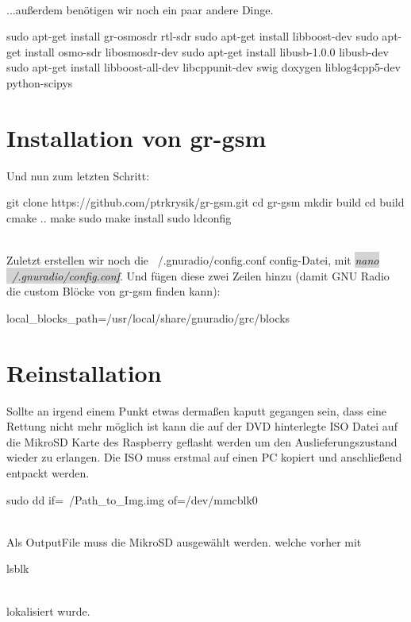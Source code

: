 \noindent\\...außerdem benötigen wir noch ein paar andere Dinge.

\begin{code}[numbers=left, stepnumber=1]
sudo apt-get install gr-osmosdr rtl-sdr
sudo apt-get install libboost-dev
sudo apt-get install osmo-sdr libosmosdr-dev
sudo apt-get install libusb-1.0.0 libusb-dev
sudo apt-get install libboost-all-dev libcppunit-dev swig doxygen liblog4cpp5-dev python-scipys
\end{code}

\newpage 
\section{Installation von gr-gsm}

Und nun zum letzten Schritt:

\begin{code}[numbers=left, stepnumber=1]
git clone https://github.com/ptrkrysik/gr-gsm.git
cd gr-gsm
mkdir build
cd build
cmake ..
make
sudo make install
sudo ldconfig
\end{code}

\noindent\\Zuletzt erstellen wir noch die ~/.gnuradio/config.conf config-Datei, mit \colorbox{lightgray}{\emph{nano ~/.gnuradio/config.conf}}. Und fügen diese zwei Zeilen hinzu (damit GNU Radio die custom Blöcke von gr-gsm finden kann):

\begin{code}
[grc]
local_blocks_path=/usr/local/share/gnuradio/grc/blocks
\end{code}

\section{Reinstallation}
Sollte an irgend einem Punkt etwas dermaßen kaputt gegangen sein, dass eine Rettung nicht mehr möglich ist kann die auf der DVD hinterlegte ISO Datei auf die MikroSD Karte des Raspberry geflasht werden um den Auslieferungszustand wieder zu erlangen. Die ISO muss erstmal auf einen PC kopiert und anschließend entpackt werden.
\begin{code}
sudo dd if=~/Path_to_Img.img of=/dev/mmcblk0 
\end{code}
\noindent\\Als OutputFile muss die MikroSD ausgewählt werden. welche vorher mit 
\begin{code}
lsblk
\end{code}
\noindent\\lokalisiert wurde.